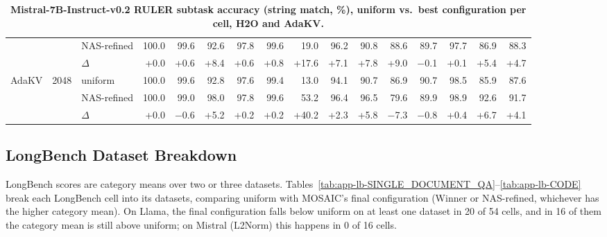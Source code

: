\begin{table}[tp]
\begin{tabular}{@{}l r l r r r r r r r r r r r r r @{}}
     &  & NAS-refined & 100.0 & 99.6 & 92.6 & 97.8 & 99.6 & 19.0 & 96.2 & 90.8 & 88.6 & 89.7 & 97.7 & 86.9 & 88.3 \\
     &  & $\Delta$ & +0.0 & +0.6 & +8.4 & +0.6 & +0.8 & +17.6 & +7.1 & +7.8 & +9.0 & $-$0.1 & +0.1 & +5.4 & +4.7 \\
    \midrule
    AdaKV & 2048 & uniform & 100.0 & 99.6 & 92.8 & 97.6 & 99.4 & 13.0 & 94.1 & 90.7 & 86.9 & 90.7 & 98.5 & 85.9 & 87.6 \\
     &  & NAS-refined & 100.0 & 99.0 & 98.0 & 97.8 & 99.6 & 53.2 & 96.4 & 96.5 & 79.6 & 89.9 & 98.9 & 92.6 & 91.7 \\
     &  & $\Delta$ & +0.0 & $-$0.6 & +5.2 & +0.2 & +0.2 & +40.2 & +2.3 & +5.8 & $-$7.3 & $-$0.8 & +0.4 & +6.7 & +4.1 \\
    \bottomrule
  \end{tabular}
  \caption{\textbf{Mistral-7B-Instruct-v0.2 RULER subtask accuracy (string match, \%), uniform vs.\ best configuration per cell, H2O and AdaKV.}}
  \label{tab:app-ruler-mistral-2}
\end{table}


\FloatBarrier
\subsection{LongBench Dataset Breakdown}
\label{app:dataset-reg}

LongBench scores are category means over two or three datasets. Tables~\ref{tab:app-lb-SINGLE_DOCUMENT_QA}--\ref{tab:app-lb-CODE} break each LongBench cell into its datasets, comparing uniform with MOSAIC's final configuration (Winner or NAS-refined, whichever has the higher category mean). On Llama, the final configuration falls below uniform on at least one dataset in 20 of 54 cells, and in 16 of them the category mean is still above uniform; on Mistral (L2Norm) this happens in 0 of 16 cells.

